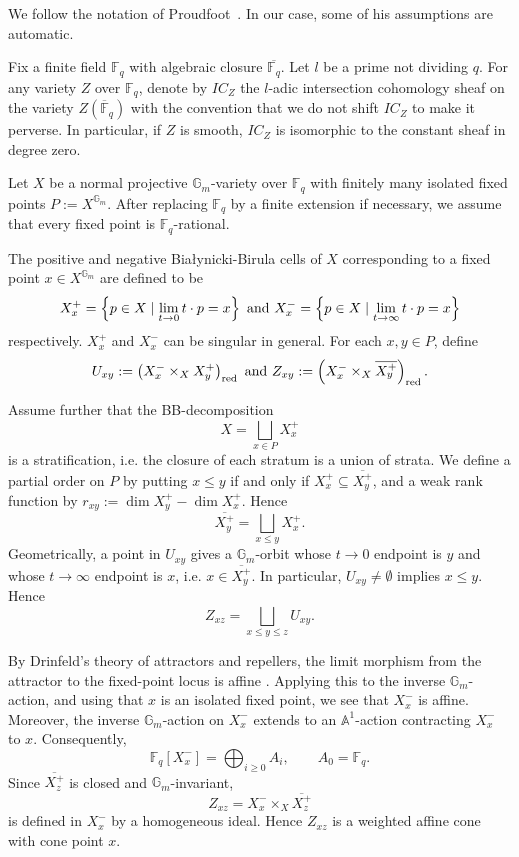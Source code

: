 \documentclass[a4paper]{article}
\newcommand\Gm{{\mathbb{G}_m}}
\begin{document}
We follow the notation of Proudfoot~\cite[Section~3]{Proudfoot2018}. In our case, some of his assumptions are automatic.

Fix a finite field $\mathbb{F}_q$ with algebraic closure $\overline{\mathbb{F}_q}$. Let $l$ be a prime not dividing $q$. For any variety $Z$ over $\mathbb{F}_q$, denote by $IC_Z$ the $l$-adic intersection cohomology sheaf on the variety $Z(\overline{\mathbb{F}}_q)$ with the convention that we do not shift $IC_Z$ to make it perverse. In particular, if $Z$ is smooth, $IC_Z$ is isomorphic to the constant sheaf in degree zero.

Let $X$ be a normal projective $\Gm$-variety over $\mathbb{F}_q$ with finitely many isolated fixed points $P:=X^\Gm$. After replacing $\mathbb{F}_q$ by a finite extension if necessary, we assume that every fixed point is $\mathbb{F}_q$-rational.

The positive and negative Bia{\l}ynicki-Birula cells of $X$ corresponding to a fixed point $x\in X^\Gm$ are defined to be
\[
        X^+_x=\left\{p\in X\mid \lim_{t\to 0}t\cdot p=x\right\}\textnormal{ and }
        X^-_x=\left\{p\in X\mid \lim_{t\to \infty }t\cdot p=x\right\}
\]
respectively. $X^+_x$ and $X^-_x$ can be singular in general. 
For each $x,y\in P$, define
\[
        U_{xy}:=\left(X^-_x\times _X X^+_y\right)_{\textnormal{red}}\textnormal{ and }
        Z_{xy}:=\left(X^-_x\times _X \overline{X^+_y}\right)_{\textnormal{red}}.
\]

Assume further that the BB-decomposition 
\[
        X=\bigsqcup _{x\in P}X^+_x
\]
is a stratification, i.e. the closure of each stratum is a union of strata. We define a partial order on $P$ by putting $x\leq y$ if and only if $X^+_x\subseteq \overline{X^+_y}$, and a weak rank function by $r_{xy}:=\dim X^+_y - \dim X^+_x$.
Hence 
\[
        \overline{X^+_y}=\bigsqcup_{x\leq y}X_x^+.
\]
Geometrically, a point in $U_{xy}$ gives a $\Gm$-orbit whose $t\rightarrow 0$ endpoint is $y$ and whose $t\rightarrow \infty $ endpoint is $x$, i.e. $x\in \overline{X^+_y}$.
In particular, $U_{xy}\neq \emptyset$ implies $x\leq y$.
Hence
\begin{equation}
        Z_{xz}=\bigsqcup_{x\leq y\leq z}U_{xy}.
        \label{eq:Z_decompose_as_U}
\end{equation}

By Drinfeld's theory of attractors and repellers, the limit morphism
from the attractor to the fixed-point locus is affine
\cite[Theorem~1.4.2]{Drinfeld2013}. Applying this to the inverse
$\Gm$-action, and using that $x$ is an isolated fixed point, we see
that $X_x^-$ is affine. Moreover, the inverse $\Gm$-action on $X_x^-$
extends to an $\mathbb A^1$-action contracting $X_x^-$ to $x$.
Consequently,
\[
        \mathbb F_q[X_x^-]=\bigoplus_{i\geq 0}A_i,
        \qquad A_0=\mathbb F_q.
\]
Since $\overline{X_z^+}$ is closed and $\Gm$-invariant,
\[
        Z_{xz}=X_x^-\times_X\overline{X_z^+}
\]
is defined in $X_x^-$ by a homogeneous ideal. Hence $Z_{xz}$ is a
weighted affine cone with cone point $x$.
\end{document}
